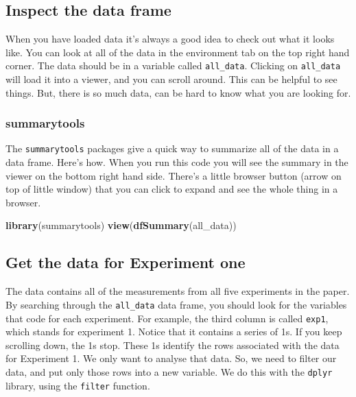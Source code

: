 \documentclass[
]{book}
\newenvironment{Shaded}{\begin{snugshade}}{\end{snugshade}}
\newcommand{\FunctionTok}[1]{\textcolor[rgb]{0.13,0.29,0.53}{\textbf{#1}}}
\newcommand{\NormalTok}[1]{#1}
\begin{document}
\hypertarget{inspect-the-data-frame}{%
\subsection{Inspect the data frame}\label{inspect-the-data-frame}}

When you have loaded data it's always a good idea to check out what it looks like. You can look at all of the data in the environment tab on the top right hand corner. The data should be in a variable called \texttt{all\_data}. Clicking on \texttt{all\_data} will load it into a viewer, and you can scroll around. This can be helpful to see things. But, there is so much data, can be hard to know what you are looking for.

\hypertarget{summarytools-1}{%
\subsubsection{summarytools}\label{summarytools-1}}

The \texttt{summarytools} packages give a quick way to summarize all of the data in a data frame. Here's how. When you run this code you will see the summary in the viewer on the bottom right hand side. There's a little browser button (arrow on top of little window) that you can click to expand and see the whole thing in a browser.

\begin{Shaded}
\begin{Highlighting}[]
\FunctionTok{library}\NormalTok{(summarytools)}
\FunctionTok{view}\NormalTok{(}\FunctionTok{dfSummary}\NormalTok{(all\_data))}
\end{Highlighting}
\end{Shaded}

\hypertarget{get-the-data-for-experiment-one}{%
\subsection{Get the data for Experiment one}\label{get-the-data-for-experiment-one}}

The data contains all of the measurements from all five experiments in the paper. By searching through the \texttt{all\_data} data frame, you should look for the variables that code for each experiment. For example, the third column is called \texttt{exp1}, which stands for experiment 1. Notice that it contains a series of 1s. If you keep scrolling down, the 1s stop. These 1s identify the rows associated with the data for Experiment 1. We only want to analyse that data. So, we need to filter our data, and put only those rows into a new variable. We do this with the \texttt{dplyr} library, using the \texttt{filter} function.
\end{document}
